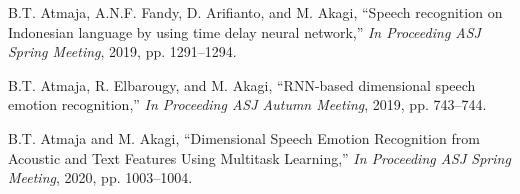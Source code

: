 \begin{publication}
\item
B.T. Atmaja, A.N.F. Fandy, D. Arifianto, and M. Akagi, ``Speech recognition on
Indonesian language by using time delay neural network,'' \textit{In Proceeding
ASJ Spring Meeting}, 2019, pp. 1291--1294.

\item
B.T. Atmaja, R. Elbarougy, and M. Akagi, ``RNN-based dimensional speech emotion
recognition,'' \textit{In Proceeding ASJ Autumn Meeting}, 2019, pp. 743--744.

\item
B.T. Atmaja and M. Akagi, ``Dimensional Speech Emotion Recognition from
Acoustic and Text Features Using Multitask Learning,'' \textit{In Proceeding
ASJ Spring Meeting}, 2020, pp. 1003--1004.

\end{publication}
